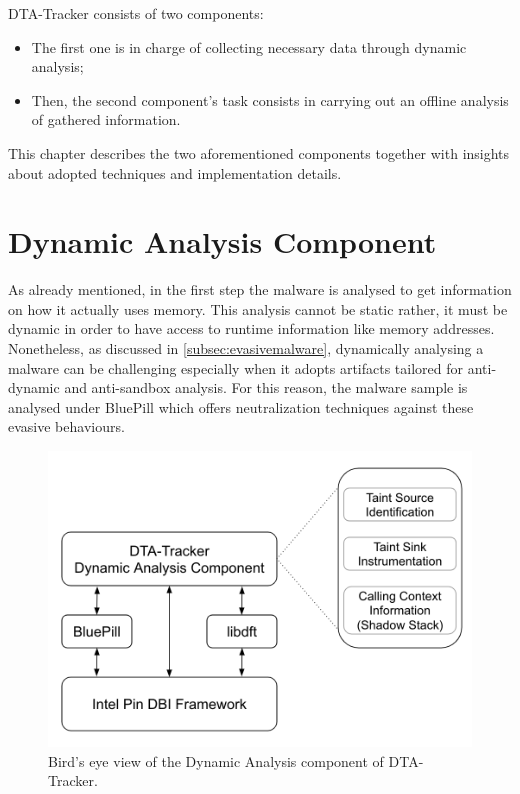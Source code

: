 \documentclass[LaM,binding=0.6cm]{sapthesis}
\begin{document}
DTA-Tracker consists of two components: 
\begin{itemize}
\item The first one is in charge of collecting necessary data through dynamic analysis;
\item Then, the second component's task consists in carrying out an offline analysis of gathered information.
\end{itemize}
This chapter describes the two aforementioned components together with insights about adopted techniques and implementation details.

\section{Dynamic Analysis Component}
As already mentioned, in the first step the malware is analysed to get information on how it actually uses memory. This analysis cannot be static rather, it must be dynamic in order to have access to runtime information like memory addresses.\\
Nonetheless, as discussed in \autoref{subsec:evasivemalware}, dynamically analysing a malware can be challenging especially when it adopts artifacts tailored for anti-dynamic and anti-sandbox analysis. For this reason, the malware sample is analysed under BluePill which offers neutralization techniques against these evasive behaviours.

\begin{figure}[h!]
\centering
\includegraphics[scale=.6]{images/dtatracker1}
\caption{Bird's eye view of the Dynamic Analysis component of DTA-Tracker.}
\end{figure}
\newpage
\end{document}
